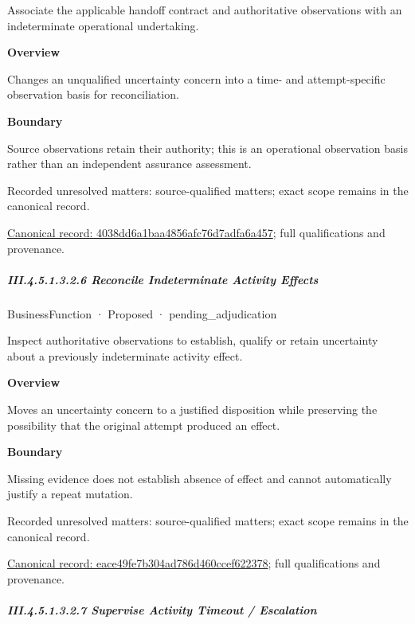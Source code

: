 Associate the applicable handoff contract and authoritative observations with an indeterminate operational undertaking.



\textbf{Overview}



Changes an unqualified uncertainty concern into a time- and attempt-specific observation basis for reconciliation.



\textbf{Boundary}



Source observations retain their authority; this is an operational observation basis rather than an independent assurance assessment.


{\small Recorded unresolved matters: source-qualified matters; exact scope remains in the canonical record.}\par
{\footnotesize \href{../../../../../../../continuum/business/business-function/4038dd6a1baa4856afc76d7adfa6a457.md}{Canonical record: 4038dd6a1baa4856afc76d7adfa6a457}; full qualifications and provenance.}\par
\subparagraph*{III.4.5.1.3.2.6 Reconcile Indeterminate Activity Effects}
\label{navigation:III.4.5.1.3.2.6}

\label{element:eace49fe7b304ad786d460ccef622378}
{\small BusinessFunction · Proposed · pending\_adjudication}\par

Inspect authoritative observations to establish, qualify or retain uncertainty about a previously indeterminate activity effect.



\textbf{Overview}



Moves an uncertainty concern to a justified disposition while preserving the possibility that the original attempt produced an effect.



\textbf{Boundary}



Missing evidence does not establish absence of effect and cannot automatically justify a repeat mutation.


{\small Recorded unresolved matters: source-qualified matters; exact scope remains in the canonical record.}\par
{\footnotesize \href{../../../../../../../continuum/business/business-function/eace49fe7b304ad786d460ccef622378.md}{Canonical record: eace49fe7b304ad786d460ccef622378}; full qualifications and provenance.}\par
\subparagraph*{III.4.5.1.3.2.7 Supervise Activity Timeout / Escalation}
\label{navigation:III.4.5.1.3.2.7}

